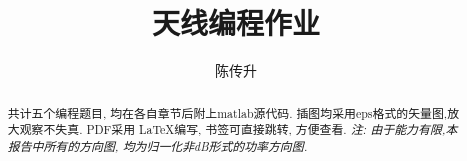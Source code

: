 \documentclass[hyperref]{ctexart}
\title{天线编程作业}
\author{陈传升}
\begin{document}
\maketitle
\newpage
\begin{abstract}
	共计五个编程题目, 均在各自章节后附上matlab源代码. 插图均采用eps格式的矢量图,放大观察不失真. PDF采用 \LaTeX 编写, 书签可直接跳转, 方便查看. 
	\textit{注: 由于能力有限,本报告中所有的方向图, 均为归一化非dB形式的功率方向图. }
\end{abstract}
\tableofcontents







\end{document}
